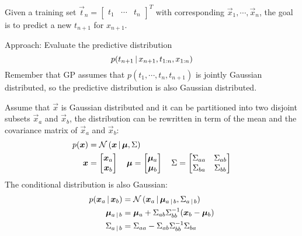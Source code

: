 			Given a training set \( \vec{t}_n = \begin{bmatrix} t_1 & \cdots & t_n \end{bmatrix}^T \) with corresponding \( \vec{x}_1, \cdots, \vec{x}_n \), the goal is to predict a new \( t_{n + 1} \) for \( x_{n + 1} \).

			Approach: Evaluate the predictive distribution
			\begin{equation}
				p(t_{n + 1} \,\vert\, x_{n + 1}, t_{1:n}, x_{1:n})
			\end{equation}
			Remember that GP assumes that \( p(t_1, \cdots, t_n, t_{n + 1}) \) is jointly Gaussian distributed, so the predictive distribution is also Gaussian distributed.

			Assume that \(\vec{x}\) is Gaussian distributed and it can be partitioned into two disjoint subsets \( \vec{x}_a \) and \( \vec{x}_b \), the distribution can be rewritten in term of the mean and the covariance matrix of \(\vec{x}_a\) and \(\vec{x}_b\):
			\begin{align}
				p(\bm{x}) & = \mathcal{N}\,(\bm{x} \,\vert\, \bm{\mu}, \Sigma)                                                                                                                                                                                     \\
				\bm{x}    & = \begin{bmatrix} \bm{x}_a \\ \bm{x}_b \end{bmatrix} \quad \bm{\mu} = \begin{bmatrix} \bm{\mu}_a \\ \bm{\mu}_b \end{bmatrix} \quad \Sigma = \begin{bmatrix} \Sigma_{aa} & \Sigma_{ab} \\ \Sigma_{ba} & \Sigma_{bb} \end{bmatrix}
			\end{align}
			The conditional distribution is also Gaussian:
			\begin{align}
				p(\bm{x}_a \,\vert\, \bm{x}_b) & = \mathcal{N}\,(\bm{x}_a \,\vert\, \bm{\mu}_{a \,\vert\, b}, \Sigma_{a \,\vert\, b}) \\
				\bm{\mu}_{a \,\vert\, b}        & = \bm{\mu}_a + \Sigma_{ab} \Sigma_{bb}^{-1} (\bm{x}_b - \bm{\mu}_b)        \\
				\Sigma_{a \,\vert\, b}           & = \Sigma_{aa} - \Sigma_{ab} \Sigma_{bb}^{-1} \Sigma_{ba}
			\end{align}


